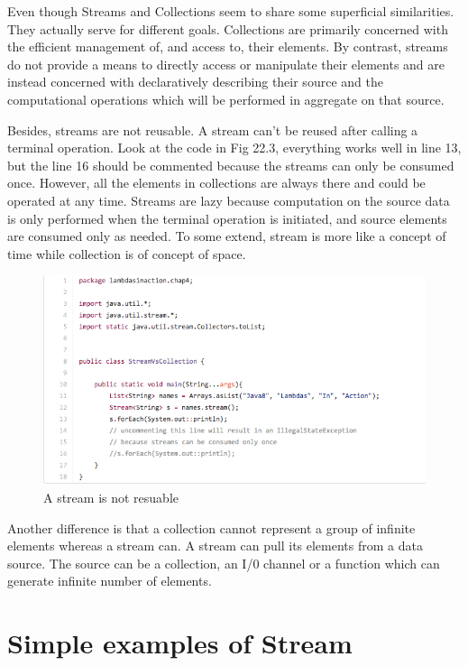 \documentclass[twoside]{article}
\begin{document}
Even though Streams and Collections seem to share some superficial similarities. They actually serve for different goals. Collections are primarily concerned with the efficient management of, and access to, their elements. By contrast, streams do not provide a means to directly access or manipulate their elements and are instead concerned with declaratively describing their source and the computational operations which will be performed in aggregate on that source. 

Besides, streams are not reusable. A stream can't be reused after calling a terminal operation. Look at the code in Fig 22.3,  everything works well in line 13, but the line 16 should be commented because the streams can only be consumed once. However, all the elements in collections are always there and could be operated at any time. Streams are lazy because computation on the source data is only performed when the terminal operation is initiated, and source elements are consumed only as needed. To some extend, stream is more like a concept of time while collection is of concept of space. 

\begin{figure}[h]
\centering
\includegraphics[scale=0.6]{streamVScollection}
\caption{A stream is not resuable }
\label{fig:2}
\end{figure}

Another difference is that a collection cannot represent a group of infinite elements whereas a stream can. A stream can pull its elements from a data source. The source can be a collection, an I/0 channel or a function which can generate infinite number of elements.


\section{Simple examples of Stream}
\end{document}
